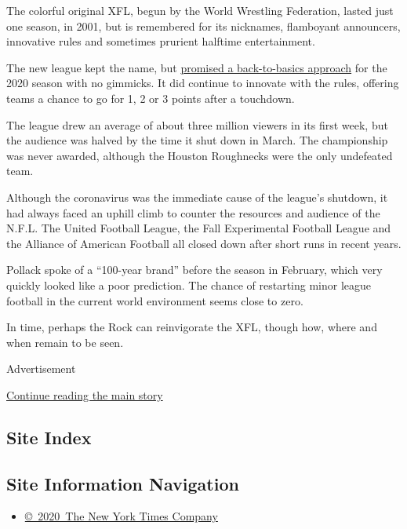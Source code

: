 The colorful original XFL, begun by the World Wrestling Federation,
lasted just one season, in 2001, but is remembered for its nicknames,
flamboyant announcers, innovative rules and sometimes prurient halftime
entertainment.

The new league kept the name, but
\href{https://www.nytimes.com/2020/02/05/sports/football/xfl-preview.html}{promised
a back-to-basics approach} for the 2020 season with no gimmicks. It did
continue to innovate with the rules, offering teams a chance to go for
1, 2 or 3 points after a touchdown.

The league drew an average of about three million viewers in its first
week, but the audience was halved by the time it shut down in March. The
championship was never awarded, although the Houston Roughnecks were the
only undefeated team.

Although the coronavirus was the immediate cause of the league's
shutdown, it had always faced an uphill climb to counter the resources
and audience of the N.F.L. The United Football League, the Fall
Experimental Football League and the Alliance of American Football all
closed down after short runs in recent years.

Pollack spoke of a ``100-year brand'' before the season in February,
which very quickly looked like a poor prediction. The chance of
restarting minor league football in the current world environment seems
close to zero.

In time, perhaps the Rock can reinvigorate the XFL, though how, where
and when remain to be seen.

Advertisement

\protect\hyperlink{after-bottom}{Continue reading the main story}

\hypertarget{site-index}{%
\subsection{Site Index}\label{site-index}}

\hypertarget{site-information-navigation}{%
\subsection{Site Information
Navigation}\label{site-information-navigation}}

\begin{itemize}
\tightlist
\item
  \href{https://help.nytimes.com/hc/en-us/articles/115014792127-Copyright-notice}{©~2020~The
  New York Times Company}
\end{itemize}

